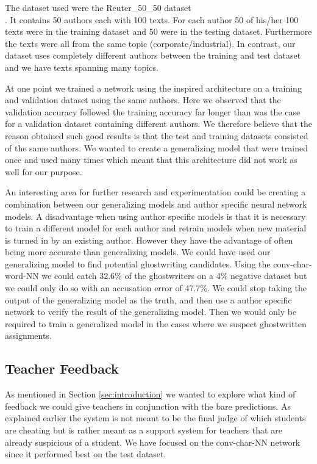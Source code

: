 The dataset \citet{qian:2018} used were the Reuter\_50\_50 dataset
\\\citep{Dua:2017}. It contains 50 authors each with 100 texts. For each
author 50 of his/her 100 texts were in the training dataset and 50 were in
the testing dataset. Furthermore the texts were all from the same topic
(corporate/industrial). In contrast, our dataset uses completely different
authors between the training and test dataset and we have texts spanning many
topics.

At one point we trained a network using the \citet{qian:2018} inspired
architecture on a training and validation dataset using the same authors. Here
we observed that the validation accuracy followed the training accuracy far
longer than was the case for a validation dataset containing different authors.
We therefore believe that the reason \citet{qian:2018} obtained such good
results is that the test and training datasets consisted of the same authors. We
wanted to create a generalizing model that were trained once and used many times
which meant that this architecture did not work as well for our purpose.

An interesting area for further research and experimentation could be creating
a combination between our generalizing models and author specific neural
network models. A disadvantage when using author specific models is that it
is necessary to train a different model for each author and retrain models
when new material is turned in by an existing author. However they have the
advantage of often being more accurate than generalizing models. We could have
used our generalizing model to find potential ghostwriting candidates. Using
the \gls{conv-char-word-NN} we could catch 32.6\% of the ghostwriters on a 4\%
negative dataset but we could only do so with an accusation error of 47.7\%. We
could stop taking the output of the generalizing model as the truth, and then
use a author specific network to verify the result of the generalizing model.
Then we would only be required to train a generalized model in the cases where
we suspect ghostwritten assignments.


\subsection{Teacher Feedback}\label{subsec:teacher_feedback_text_comparisons}

As mentioned in Section \ref{sec:introduction} we wanted to explore what kind
of feedback we could give teachers in conjunction with the bare predictions.
As explained earlier the system is not meant to be the final judge of which
students are cheating but is rather meant as a support system for teachers that
are already suspicious of a student. We have focused on the \gls{conv-char-NN}
network since it performed best on the test dataset.


